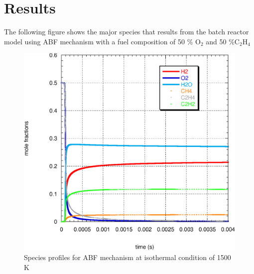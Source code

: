 \section{Results}
The following figure shows the major species that results from the batch reactor model using ABF mechanism with a fuel composition of 50 \% O$_2$ and 50 \%C$_2$H$_4$
\begin{figure}[h]
 \centering
\includegraphics[scale=0.8]{batch_profile.eps}
\caption{Species profiles for ABF mechanism at isothermal condition of 1500 K}
\end{figure}

%
%
%
